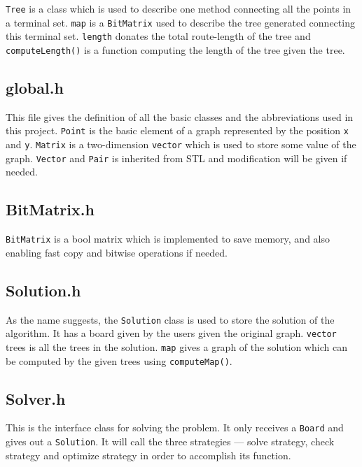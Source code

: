 \documentclass[12pt, a4paper]{article}
\begin{document}
			\texttt{Tree} is a class which is used to describe one method connecting all the points in a terminal set. \texttt{map} is a \texttt{BitMatrix} used to describe the tree generated connecting this terminal set. \texttt{length} donates the total route-length of the tree and \texttt{computeLength()} is a function computing the length of the tree given the tree.
		
		\subsection{global.h}

			This file gives the definition of all the basic classes and the abbreviations used in this project. \texttt{Point} is the basic element of a graph represented by the position \texttt{x} and \texttt{y}. \texttt{Matrix} is a two-dimension \texttt{vector} which is used to store some value of the graph. \texttt{Vector} and \texttt{Pair} is inherited from STL and modification will be given if needed.
		
		\subsection{BitMatrix.h}

			\texttt{BitMatrix} is a bool matrix which is implemented to save memory, and also enabling fast copy and bitwise operations if needed.
		
		\subsection{Solution.h}

			As the name suggests, the \texttt{Solution} class is used to store the solution of the algorithm. It has a board given by the users given the original graph. \texttt{vector} trees is all the trees in the solution. \texttt{map} gives a graph of the solution which can be computed by the given trees using \texttt{computeMap()}.
		
		\subsection{Solver.h}
		
			This is the interface class for solving the problem. It only receives a \texttt{Board} and gives out a \texttt{Solution}. It will call the three strategies --- solve strategy, check strategy and optimize strategy in order to accomplish its function.
		
\end{document}
